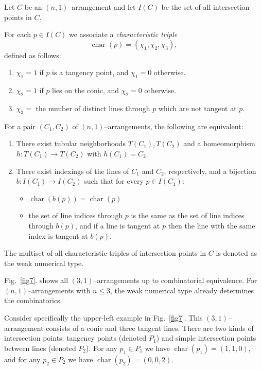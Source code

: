 \documentclass{svproc}
\begin{document}
Let $C$ be an $(n,1)$--arrangement and let $I(C)$ be the set of all intersection points in $C$.
\begin{definition}
    For each $p \in I(C)$ we associate a \emph{characteristic triple}
\[
    \operatorname{char}(p) = (\chi_1,\chi_2,\chi_3),
\]
defined as follows:
\begin{enumerate}
    \item $\chi_1 = 1$ if $p$ is a tangency point, and $\chi_1 = 0$ otherwise.
    \item $\chi_2 = 1$ if $p$ lies on the conic, and $\chi_2 = 0$ otherwise.
    \item $\chi_3 =$ the number of distinct lines through $p$ which are not tangent at $p$.
\end{enumerate}

\end{definition}
\begin{theorem} \label{thrm32}
    For a pair $(C_1,C_2)$ of $(n,1)$--arrangements, the following are equivalent:
    \begin{enumerate}
    \item There exist tubular neighborhoods $T(C_1),T(C_2)$ and a homeomorphism 
    $h : T(C_1) \to T(C_2)$ with $h(C_1)=C_2$.
    \item There exist indexings of the lines of $C_1$ and $C_2$, respectively, and a bijection
    $b : I(C_1) \to I(C_2)$ such that for every $p \in I(C_1)$:
   \begin{itemize}
        \item $\operatorname{char}(b(p)) = \operatorname{char}(p)$
        \item the set of line indices through $p$ is the same as the set of line indices through $b(p)$,
              and if a line is tangent at $p$ then the line with the same index is tangent at $b(p)$.
    \end{itemize}
\end{enumerate}
\end{theorem}

The multiset of all characteristic triples of intersection points in $C$ is denoted as the weak numerical type. 
\begin{example}
Fig.~\ref{fig7}. shows all $(3,1)$–arrangements up to combinatorial
equivalence. For $(n,1)$–arrangements with $n \le 3$, the weak numerical type
already determines the combinatorics.

Consider specifically the upper-left example in Fig.~\ref{fig7}. This
$(3,1)$–arrangement consists of a conic and three tangent lines. There are two
kinds of intersection points: tangency points (denoted $P_1$) and simple
intersection points between lines (denoted $P_2$). For any $p_1 \in P_1$ we have
$\operatorname{char}(p_1) = (1,1,0)$, and for any $p_2 \in P_2$ we have
$\operatorname{char}(p_2) = (0,0,2)$.
\end{example}
\end{document}

